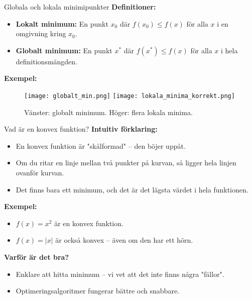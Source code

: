 \documentclass[10pt,english]{beamer}
\begin{document}
\begin{frame}{Globala och lokala minimipunkter}
    \textbf{Definitioner:}
    \begin{itemize}
        \item \textbf{Lokalt minimum:} En punkt $x_0$ där $f(x_0) \leq f(x)$ för alla $x$ i en omgivning kring $x_0$.
        \item \textbf{Globalt minimum:} En punkt $x^*$ där $f(x^*) \leq f(x)$ för alla $x$ i hela definitionsmängden.
    \end{itemize}

    \vspace{0.1cm}
    \textbf{Exempel:}


    \begin{figure}[htbp]
        \centering
        \texttt{[image: globalt\_min.png]}
        \hspace{0.5cm}
        \texttt{[image: lokala\_minima\_korrekt.png]}
        \caption*{Vänster: globalt minimum. Höger: flera lokala minima.}
    \end{figure}
\end{frame}


\begin{frame}{Vad är en konvex funktion?}
    \textbf{Intuitiv förklaring:}
    \begin{itemize}
        \item En konvex funktion är "skålformad" – den böjer uppåt.
        \item Om du ritar en linje mellan två punkter på kurvan, så ligger hela linjen ovanför kurvan.
        \item Det finns bara ett minimum, och det är det lägsta värdet i hela funktionen.
    \end{itemize}

    \vspace{0.4cm}
    \textbf{Exempel:}
    \begin{itemize}
        \item $f(x) = x^2$ är en konvex funktion.
        \item $f(x) = |x|$ är också konvex – även om den har ett hörn.
    \end{itemize}

    \vspace{0.4cm}
    \textbf{Varför är det bra?}
    \begin{itemize}
        \item Enklare att hitta minimum – vi vet att det inte finns några "fällor".
        \item Optimeringsalgoritmer fungerar bättre och snabbare.
    \end{itemize}
\end{frame}
\end{document}
